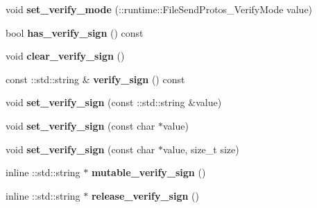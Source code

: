 \begin{DoxyCompactItemize}
\mbox{\label{classruntime_1_1FileSendProtos_a73625f2c2a6ea94431428aff694d0109}} 
void {\bfseries set\+\_\+verify\+\_\+mode} (\+::runtime\+::\+File\+Send\+Protos\+\_\+\+Verify\+Mode value)
\item 
\mbox{\label{classruntime_1_1FileSendProtos_a09e87a4d1f8b4553a9c836e0b6689fd6}} 
bool {\bfseries has\+\_\+verify\+\_\+sign} () const
\item 
\mbox{\label{classruntime_1_1FileSendProtos_afe647962bc42939ebf1a119ff3a69d17}} 
void {\bfseries clear\+\_\+verify\+\_\+sign} ()
\item 
\mbox{\label{classruntime_1_1FileSendProtos_a3615e3b085ab6c32604272d4798c4cfa}} 
const \+::std\+::string \& {\bfseries verify\+\_\+sign} () const
\item 
\mbox{\label{classruntime_1_1FileSendProtos_a2cdc2c3681faff4466e6c94e495eabee}} 
void {\bfseries set\+\_\+verify\+\_\+sign} (const \+::std\+::string \&value)
\item 
\mbox{\label{classruntime_1_1FileSendProtos_a2abc9bdb120d872044c6326233cc4fda}} 
void {\bfseries set\+\_\+verify\+\_\+sign} (const char $\ast$value)
\item 
\mbox{\label{classruntime_1_1FileSendProtos_a03d72f6f4010d41a452750d197dd44f6}} 
void {\bfseries set\+\_\+verify\+\_\+sign} (const char $\ast$value, size\+\_\+t size)
\item 
\mbox{\label{classruntime_1_1FileSendProtos_a321d7ea2c1089a810b8915da67b1cb37}} 
inline \+::std\+::string $\ast$ {\bfseries mutable\+\_\+verify\+\_\+sign} ()
\item 
\mbox{\label{classruntime_1_1FileSendProtos_acee7bd26bd7e313e9e13e5abaf08f5ad}} 
inline \+::std\+::string $\ast$ {\bfseries release\+\_\+verify\+\_\+sign} ()
\item 
\mbox{\label{classruntime_1_1FileSendProtos_acd8b01f75357e4e626e819df4b5cb600}} 

\end{DoxyCompactItemize}
